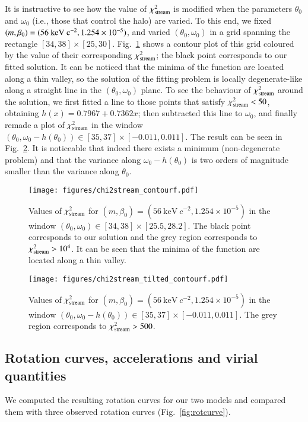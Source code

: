 \documentclass[twocolumn]{aa}
\begin{document}
It is instructive to see how the value of $\chi^2_{\rm{stream}}$ is modified when the parameters $\theta_0$ and $\omega_0$ (i.e., those that control the halo) are varied. To this end, we fixed $(m, \beta_0)=(56~\rm{keV}~c^{-2}, 1.254\times10^{-5})$, and varied $(\theta_0, \omega_0)$ in a grid spanning the rectangle $[34, 38]\times[25, 30]$.
Fig.~\ref{fig:chi2stream} shows a contour plot of this grid coloured by the value of their corresponding $\chi^2_{\rm{stream}}$; the black point corresponds to our fitted solution.
It can be noticed that the minima of the function are located along a thin valley, so the solution of the fitting problem is locally degenerate-like along a straight line in the $(\theta_0, \omega_0)$ plane. 
To see the behaviour of $\chi^2_{\rm{stream}}$ around the solution, we first fitted a line to those points that satisfy $\chi^2_{\rm{stream}}<50$,
obtaining $h(x)= 0.7967+0.7362x$; then subtracted this line to $\omega_0$, and finally remade a plot of $\chi^2_{\rm{stream}}$ in the window $(\theta_0, \omega_0-h(\theta_0))\in[35, 37]\times[-0.011,0.011]$. The result can be seen in Fig.~\ref{fig:chi2stream_tilted}. It is noticeable that indeed there exists a minimum (non-degenerate problem) and that
the variance along $\omega_0-h(\theta_0)$ is two orders of magnitude smaller than the variance along $\theta_0$.
%
\begin{figure}
   \centering
   \texttt{[image: figures/chi2stream\_contourf.pdf]}
   \caption{Values of $\chi^2_{\rm{stream}}$ for $(m, \beta_0)=(56~\mathrm{keV}~c^{-2}, 1.254\times10^{-5})$ in the window $(\theta_0, \omega_0)\in[34, 38]\times[25.5,28.2]$. The black point corresponds to our solution and the grey region corresponds to $\chi^2_{\rm{stream}} >10^4$. It can be seen that the minima of the function are located along a thin valley.}
   \label{fig:chi2stream}
\end{figure}
\begin{figure}
   \centering
   \texttt{[image: figures/chi2stream\_tilted\_contourf.pdf]}
   \caption{Values of $\chi^2_{\rm{stream}}$ for $(m, \beta_0)=(56~\mathrm{keV}~c^{-2}, 1.254\times10^{-5})$ in
   the window $(\theta_0, \omega_0-h(\theta_0))\in[35, 37]\times[-0.011,0.011]$. The grey region corresponds to $\chi^2_{\rm{stream}} > 500 $. }
   \label{fig:chi2stream_tilted}
\end{figure}

\subsection{Rotation curves, accelerations and virial quantities}
We computed the resulting rotation curves for our two models and compared them with three observed rotation curves (Fig.~\ref{fig:rotcurve}). 
\end{document}
